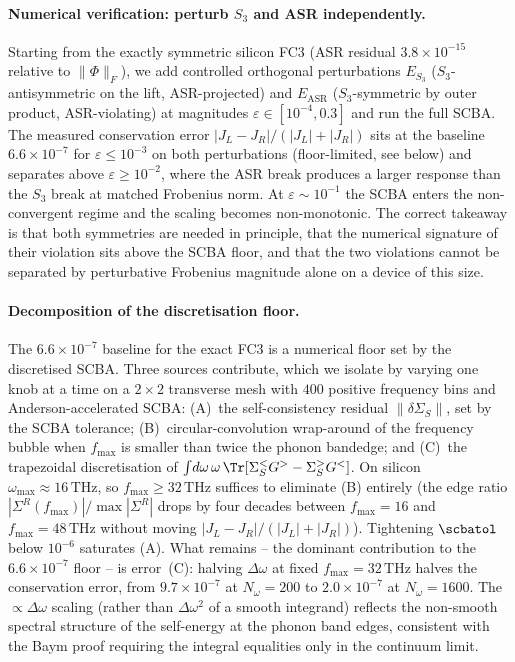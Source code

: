 \paragraph{Numerical verification: perturb $S_3$ and ASR independently.} Starting from the
exactly symmetric silicon FC3 (ASR residual $3.8\times 10^{-15}$ relative to
$\|\Phi\|_F$), we add controlled orthogonal perturbations $E_{S_3}$ ($S_3$-antisymmetric
on the lift, ASR-projected) and $E_{\mathrm{ASR}}$ ($S_3$-symmetric by outer product,
ASR-violating) at magnitudes $\varepsilon\!\in\![10^{-4},0.3]$ and run the full SCBA. The
measured conservation error $|J_L\!-\!J_R|/(|J_L|\!+\!|J_R|)$ sits at the baseline
$6.6\times 10^{-7}$ for $\varepsilon\!\le\!10^{-3}$ on both perturbations (floor-limited,
see below) and separates above $\varepsilon\!\ge\!10^{-2}$, where the ASR break produces a
larger response than the $S_3$ break at matched Frobenius norm. At $\varepsilon\!\sim\!
10^{-1}$ the SCBA enters the non-convergent regime and the scaling becomes non-monotonic.
The correct takeaway is that both symmetries are needed in principle, that the numerical
signature of their violation sits above the SCBA floor, and that the two violations
cannot be separated by perturbative Frobenius magnitude alone on a device of this size.

\paragraph{Decomposition of the discretisation floor.} The $6.6\times 10^{-7}$ baseline
for the exact FC3 is a numerical floor set by the discretised SCBA. Three sources
contribute, which we isolate by varying one knob at a time on a $2{\times}2$ transverse
mesh with $400$ positive frequency bins and Anderson-accelerated SCBA:
(A)~the self-consistency residual $\|\delta\Sigma_S\|$, set by the SCBA tolerance;
(B)~circular-convolution wrap-around of the frequency bubble when $f_{\max}$ is smaller
than twice the phonon bandedge; and (C)~the trapezoidal discretisation of
$\int\!d\omega\,\omega\,\Tr[\Sigma_S^< G^> - \Sigma_S^>G^<]$. On silicon $\omega_{\max}
\!\approx\!16\,\mathrm{THz}$, so $f_{\max}\!\ge\!32\,\mathrm{THz}$ suffices to eliminate
(B) entirely (the edge ratio $|\Sigma^R(f_{\max})|/\max|\Sigma^R|$ drops by four decades
between $f_{\max}\!=\!16$ and $f_{\max}\!=\!48\,\mathrm{THz}$ without moving
$|J_L\!-\!J_R|/(|J_L|\!+\!|J_R|)$). Tightening $\scbatol$ below $10^{-6}$ saturates (A).
What remains -- the dominant contribution to the $6.6\times 10^{-7}$ floor -- is error~(C):
halving $\Delta\omega$ at fixed $f_{\max}\!=\!32\,\mathrm{THz}$ halves the conservation
error, from $9.7\times 10^{-7}$ at $N_\omega\!=\!200$ to $2.0\times 10^{-7}$ at $N_\omega
\!=\!1600$. The $\propto\!\Delta\omega$ scaling (rather than $\Delta\omega^{2}$ of a
smooth integrand) reflects the non-smooth spectral structure of the self-energy at the
phonon band edges, consistent with the Baym proof requiring the integral equalities only
in the continuum limit.

